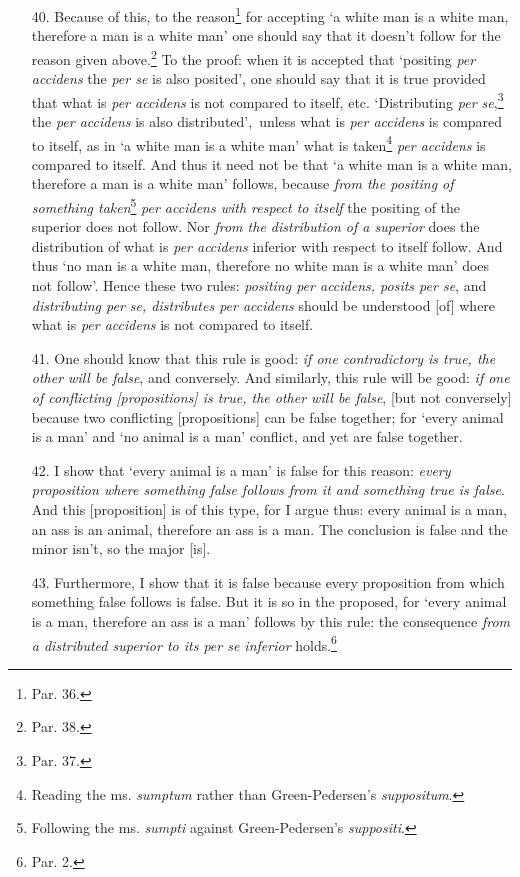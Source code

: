 \documentclass[]{article}
\begin{document}
\begin{enumerate}
\item[40.] Because of this, to the reason\footnote{Par. 36.} for accepting `a white man is a white man, therefore a man is a white man' one should say that it doesn't follow for the reason given above.\footnote{Par. 38.} To the proof: when it is accepted that `positing \textit{per accidens} the \textit{per se} is also posited', one should say that it is true provided that what is \textit{per accidens} is not compared to itself, etc. `Distributing \textit{per se},\footnote{Par. 37.} the \textit{per accidens} is also distributed',\ unless what is \textit{per accidens} is compared to itself, as in `a white man is a white man' what is taken\footnote{Reading the ms. \textit{sumptum} rather than Green-Pedersen's \textit{suppositum}.} \textit{per accidens} is compared to itself. And thus it need not be that `a white man is a white man, therefore a man is a white man' follows, because \textit{from the positing of something taken}\footnote{Following the ms. \textit{sumpti} against Green-Pedersen's \textit{suppositi}.} \textit{per accidens with respect to itself} the positing of the superior does not follow. Nor \textit{from the distribution of a superior} does the distribution of what is \textit{per accidens} inferior with respect to itself follow. And thus `no man is a white man, therefore no white man is a white man' does not follow'. Hence these two rules: \textit{positing per accidens, posits per se}, and \textit{distributing per se, distributes per accidens} should be understood [of] where what is \textit{per accidens} is not compared to itself.
\item[41.] One should know that this rule is good: \textit{if one contradictory is true, the other will be false}, and conversely. And similarly, this rule will be good: \textit{if one of conflicting [propositions] is true, the other will be false}, [but not conversely] because two conflicting [propositions] can be false together; for `every animal is a man' and `no animal is a man' conflict, and yet are false together.
\item[42.] I show that `every animal is a man' is false for this reason: \textit{every proposition where something false follows from it and something true is false}. And this [proposition] is of this type, for I argue thus: every animal is a man, an ass is an animal, therefore an ass is a man. The conclusion is false and the minor isn't, so the major [is].
\item[43.] Furthermore, I show that it is false because every proposition from which something false follows is false. But it is so in the proposed, for `every animal is a man, therefore an ass is a man' follows by this rule: the consequence \textit{from a distributed superior to its per se inferior} holds.\footnote{Par. 2.}

\end{enumerate}
\end{document}
